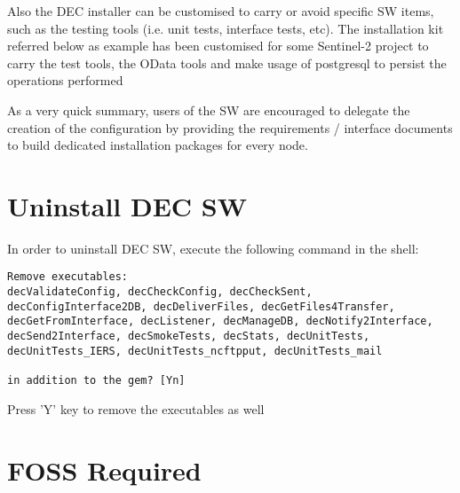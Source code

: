 \documentclass[dec_sum_main.tex]{subfiles}
\begin{document}
 \newline

 \newline

 \newline

\noindent
Also the DEC installer can be customised to carry or avoid specific SW items, such as the testing tools (i.e. unit tests, interface tests, etc). The installation kit referred below as example has been customised for some Sentinel-2 project to carry the test tools, the OData tools and make usage of postgresql to persist the operations performed \newline

 \newline

\noindent
As a very quick summary, users of the SW are encouraged to delegate the creation of the configuration by providing the requirements / interface documents to build dedicated installation packages for every node. 
\par


\section{Uninstall DEC SW}

In order to uninstall DEC SW, execute the following command in the shell:
\par 
{}
\par 

\begin{verbatim}
Remove executables:
decValidateConfig, decCheckConfig, decCheckSent, decConfigInterface2DB, decDeliverFiles, decGetFiles4Transfer, decGetFromInterface, decListener, decManageDB, decNotify2Interface, decSend2Interface, decSmokeTests, decStats, decUnitTests, decUnitTests_IERS, decUnitTests_ncftpput, decUnitTests_mail

in addition to the gem? [Yn]
\end{verbatim}

Press 'Y' key to remove the executables as well

\label{COTS}
\label{FOSS}
\section{FOSS Required}
\end{document}
